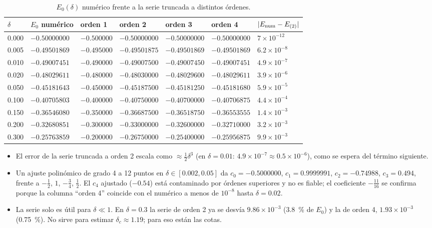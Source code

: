 \documentclass[11pt]{article}
\newcommand{\dc}{\delta_c}
\begin{document}
\begin{table}[H]
\centering
\small
\caption{$E_0(\delta)$ numérico frente a la serie truncada a distintos órdenes.}
\begin{tabular}{@{}lllllll@{}}
\toprule
$\delta$ & $E_0$ numérico & orden 1 & orden 2 & orden 3 & orden 4 & $|E_{\rm num}-E_{(2)}|$\\
\midrule
0.000 & $-0.50000000$ & $-0.500000$ & $-0.50000000$ & $-0.50000000$ & $-0.50000000$ & $7\times10^{-12}$\\
0.005 & $-0.49501869$ & $-0.495000$ & $-0.49501875$ & $-0.49501869$ & $-0.49501869$ & $6.2\times10^{-8}$\\
0.010 & $-0.49007451$ & $-0.490000$ & $-0.49007500$ & $-0.49007450$ & $-0.49007451$ & $4.9\times10^{-7}$\\
0.020 & $-0.48029611$ & $-0.480000$ & $-0.48030000$ & $-0.48029600$ & $-0.48029611$ & $3.9\times10^{-6}$\\
0.050 & $-0.45181643$ & $-0.450000$ & $-0.45187500$ & $-0.45181250$ & $-0.45181680$ & $5.9\times10^{-5}$\\
0.100 & $-0.40705803$ & $-0.400000$ & $-0.40750000$ & $-0.40700000$ & $-0.40706875$ & $4.4\times10^{-4}$\\
0.150 & $-0.36546080$ & $-0.350000$ & $-0.36687500$ & $-0.36518750$ & $-0.36553555$ & $1.4\times10^{-3}$\\
0.200 & $-0.32680851$ & $-0.300000$ & $-0.33000000$ & $-0.32600000$ & $-0.32710000$ & $3.2\times10^{-3}$\\
0.300 & $-0.25763859$ & $-0.200000$ & $-0.26750000$ & $-0.25400000$ & $-0.25956875$ & $9.9\times10^{-3}$\\
\bottomrule
\end{tabular}
\end{table}

\begin{itemize}
\item El error de la serie truncada a orden 2 escala como $\approx\tfrac12\delta^3$ (en $\delta=0.01$: $4.9\times10^{-7}\approx0.5\times10^{-6}$), como se espera del término siguiente.
\item Un ajuste polinómico de grado 4 a 12 puntos en $\delta\in[0.002,0.05]$ da $c_0=-0.5000000$, $c_1=0.9999991$, $c_2=-0.74988$, $c_3=0.494$, frente a $-\tfrac12$, $1$, $-\tfrac34$, $\tfrac12$. El $c_4$ ajustado ($-0.54$) está contaminado por órdenes superiores y no es fiable; el coeficiente $-\tfrac{11}{16}$ se confirma porque la columna ``orden 4'' coincide con el numérico a menos de $10^{-8}$ hasta $\delta=0.02$.
\item La serie solo es útil para $\delta\ll1$. En $\delta=0.3$ la serie de orden 2 ya se desvía $9.86\times10^{-3}$ (3.8~\% de $E_0$) y la de orden 4, $1.93\times10^{-3}$ (0.75~\%). No sirve para estimar $\dc\approx1.19$; para eso están las cotas.
\end{itemize}
\end{document}
